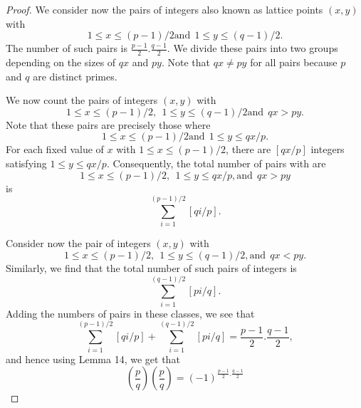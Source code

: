 \documentclass[12pt,letterpaper]{book}
\begin{document}
\begin{proof}
We consider now the pairs of integers also known as lattice points
$(x,y)$ with
\begin{equation*}
1\leq x\leq (p-1)/2 \mbox{and} \ \  1\leq y\leq (q-1)/2.
\end{equation*}
The number of such pairs is $\frac{p-1}{2}.\frac{q-1}{2}$. We divide
these pairs into two groups depending on the sizes of $qx$ and $py$.
Note that $qx\neq py$ for all pairs because $p$ and $q$ are distinct
primes.
\par We now count the pairs of integers $(x,y)$ with
\begin{equation*}
1\leq x\leq (p-1)/2, \ \ 1\leq y\leq (q-1)/2 \mbox{and} \ \ qx>py.
\end{equation*}
Note that these pairs are precisely those where
\begin{equation*}
1\leq x\leq (p-1)/2 \mbox{and} \ \ 1\leq y\leq qx/p.
\end{equation*}
For each fixed value of $x$ with $1\leq x\leq (p-1)/2$, there are
$[qx/p]$ integers satisfying $1\leq y\leq qx/p$. Consequently, the
total number of pairs with are
\begin{equation*}
1\leq x\leq (p-1)/2, \ \ 1\leq y\leq qx/p, \mbox{and} \ \ qx>py
\end{equation*}
is
\begin{equation*}
\sum_{i=1}^{(p-1)/2}[qi/p].
\end{equation*}
\par Consider now the pair of integers $(x,y)$ with
\begin{equation*}
1\leq x\leq (p-1)/2, \ \ 1\leq y\leq (q-1)/2, \mbox{and} \ \  qx<py.
\end{equation*}
Similarly, we find that the total number of such pairs of integers
is
\begin{equation*}
\sum_{i=1}^{(q-1)/2}[pi/q].
\end{equation*}
Adding the numbers of pairs in these classes, we see that
\begin{equation*}
\sum_{i=1}^{(p-1)/2}[qi/p]+
\sum_{i=1}^{(q-1)/2}[pi/q]=\frac{p-1}{2}.\frac{q-1}{2},
\end{equation*}
and hence using Lemma 14, we get that
\begin{equation*}
\left(\frac{p}{q}\right)\left(\frac{p}{q}\right)=(-1)^{\frac{p-1}{2}.\frac{q-1}{2}}
\end{equation*}
\end{proof}
\end{document}
